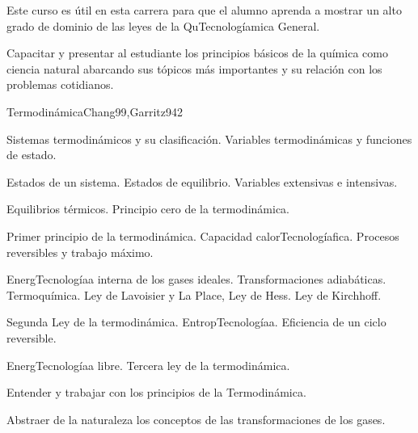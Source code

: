 \begin{syllabus}


\begin{justification}
Este curso es útil en esta carrera para que el alumno aprenda a mostrar un alto grado de dominio de las leyes de la QuTecnologíamica General.
\end{justification}

\begin{goals}
\item Capacitar y presentar al estudiante los principios básicos de la química como ciencia natural abarcando sus tópicos más importantes y su relación con los problemas cotidianos.
\end{goals}

\begin{outcomes}
\end{outcomes}

\begin{unit}{Termodinámica}{Chang99,Garritz94}{2}
\begin{topics}
	\item Sistemas termodinámicos y su clasificación. Variables termodinámicas y funciones de estado.
	\item Estados de un sistema. Estados de equilibrio. Variables extensivas e intensivas.
	\item Equilibrios térmicos. Principio cero de la termodinámica.
	\item Primer principio de la termodinámica. Capacidad calorTecnologíafica. Procesos reversibles y trabajo máximo.
	\item EnergTecnologíaa interna de los gases ideales. Transformaciones adiabáticas. Termoquímica. Ley de Lavoisier y La Place, Ley de Hess. Ley de Kirchhoff.
	\item Segunda Ley de la termodinámica. EntropTecnologíaa. Eficiencia de un ciclo reversible.
	\item EnergTecnologíaa libre. Tercera ley de la termodinámica.
\end{topics}

\begin{unitgoals}
	\item Entender y trabajar con los principios de la Termodinámica.
	\item Abstraer de la naturaleza los conceptos de las transformaciones de los gases.
\end{unitgoals}
\end{unit}


\end{syllabus}
